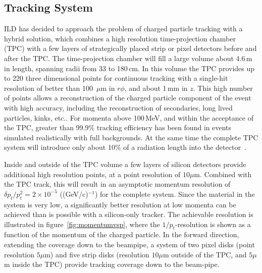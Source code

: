 \documentclass[%
 amsmath,amssymb,
 aps,
 longbibliography,
]{revtex4-1}
\begin{document}
\subsection{Tracking System}

 ILD has decided to approach the problem of charged particle tracking with a hybrid solution, which combines a high resolution time-projection chamber (TPC) with a few layers of strategically placed strip or pixel detectors before and after the TPC. 
The time-projection chamber will fill a large volume about 4.6\,m in length, spanning radii from 33 to 180\,cm. In this volume the TPC provides up to 220 three dimensional points for continuous tracking with a single-hit resolution of better than 100~$\mu\mathrm{m}$ in $r \phi$, and about 1\,mm in $z$. This high number of points allows a reconstruction of the charged particle component of the event with high accuracy, including the reconstruction of secondaries, long lived particles, kinks, etc.. For momenta above 100\,MeV, and within the acceptance of the TPC, greater than 99.9\% tracking efficiency has been found in events simulated realistically with full backgrounds. At the same time the complete TPC system will introduce only about 10\% of a radiation length into the detector~\cite{Diener:2012mc}. 

Inside and outside of the TPC volume a few layers of silicon detectors provide additional high resolution points, at a point resolution of $10\mu \mathrm{m}$. Combined with the TPC track, this will result in an asymptotic momentum resolution of $\delta p_t / p_t^2 = 2 \times 10^{-5}$ ((GeV/c)$^{-1}$) for the complete system. Since the material in the system is very low, a significantly better resolution at low momenta can be achieved than is possible with a silicon-only tracker. The achievable resolution is illustrated in figure~\ref{fig:momentumvsp}, where the $1/p_t$-resolution is shown as a function of the momentum of the charged particle. In the forward direction, extending the coverage down to the beampipe, a system of two pixel disks (point resolution $5 \mu$m) and five strip disks (resolution $10 \mu$m outside of the TPC, and $5 \mu$m inside the TPC) provide tracking coverage down to the beam-pipe.
\end{document}
